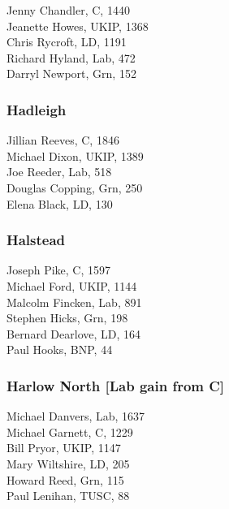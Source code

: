 \documentclass[a4paper,openany,10pt]{book}
\begin{document}


Jenny Chandler, C, 1440\\
Jeanette Howes, UKIP, 1368\\
Chris Rycroft, LD, 1191\\
Richard Hyland, Lab, 472\\
Darryl Newport, Grn, 152\\


\subsubsection*{Hadleigh}



Jillian Reeves, C, 1846\\
Michael Dixon, UKIP, 1389\\
Joe Reeder, Lab, 518\\
Douglas Copping, Grn, 250\\
Elena Black, LD, 130\\


\subsubsection*{Halstead}



Joseph Pike, C, 1597\\
Michael Ford, UKIP, 1144\\
Malcolm Fincken, Lab, 891\\
Stephen Hicks, Grn, 198\\
Bernard Dearlove, LD, 164\\
Paul Hooks, BNP, 44\\


\subsubsection*{Harlow North \hspace*{\fill}\nolinebreak[1]%
\enspace\hspace*{\fill}
[Lab gain from C]}



Michael Danvers, Lab, 1637\\
Michael Garnett, C, 1229\\
Bill Pryor, UKIP, 1147\\
Mary Wiltshire, LD, 205\\
Howard Reed, Grn, 115\\
Paul Lenihan, TUSC, 88\\
\end{document}
